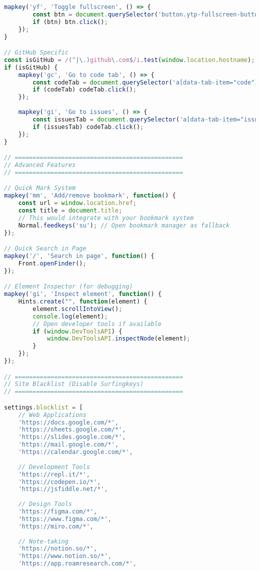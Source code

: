 \documentclass[11pt,a4paper,oneside]{book}
\begin{document}
\begin{codebox}
\begin{lstlisting}[language=JavaScript]
    mapkey('yf', 'Toggle fullscreen', () => {
        const btn = document.querySelector('button.ytp-fullscreen-button');
        if (btn) btn.click();
    });
}

// GitHub Specific
const isGitHub = /(^|\.)github\.com$/i.test(window.location.hostname);
if (isGitHub) {
    mapkey('gc', 'Go to code tab', () => {
        const codeTab = document.querySelector('a[data-tab-item="code"]');
        if (codeTab) codeTab.click();
    });
    
    mapkey('gi', 'Go to issues', () => {
        const issuesTab = document.querySelector('a[data-tab-item="issues"]');
        if (issuesTab) codeTab.click();
    });
}

// ===============================================
// Advanced Features
// ===============================================

// Quick Mark System
mapkey('mm', 'Add/remove bookmark', function() {
    const url = window.location.href;
    const title = document.title;
    // This would integrate with your bookmark system
    Normal.feedkeys('su'); // Open bookmark manager as fallback
});

// Quick Search in Page
mapkey('/', 'Search in page', function() {
    Front.openFinder();
});

// Element Inspector (for debugging)
mapkey('gi', 'Inspect element', function() {
    Hints.create("", function(element) {
        element.scrollIntoView();
        console.log(element);
        // Open developer tools if available
        if (window.DevToolsAPI) {
            window.DevToolsAPI.inspectNode(element);
        }
    });
});

// ===============================================
// Site Blacklist (Disable Surfingkeys)
// ===============================================

settings.blocklist = [
    // Web Applications
    'https://docs.google.com/*',
    'https://sheets.google.com/*',
    'https://slides.google.com/*',
    'https://mail.google.com/*',
    'https://calendar.google.com/*',
    
    // Development Tools
    'https://repl.it/*',
    'https://codepen.io/*',
    'https://jsfiddle.net/*',
    
    // Design Tools
    'https://figma.com/*',
    'https://www.figma.com/*',
    'https://miro.com/*',
    
    // Note-taking
    'https://notion.so/*',
    'https://www.notion.so/*',
    'https://app.roamresearch.com/*',
    

\end{lstlisting}
\end{codebox}
\end{document}
